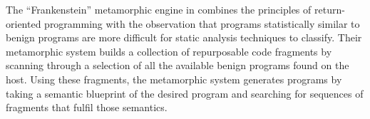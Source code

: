     The ``Frankenstein'' metamorphic engine in \cite{franken} combines the
    principles of return-oriented programming with the observation that programs
    statistically similar to benign programs are more difficult for static
    analysis techniques to classify. Their metamorphic system builds a
    collection of repurposable code fragments by scanning through a selection of
    all the available benign programs found on the host. Using these fragments,
    the metamorphic system generates programs by taking a semantic blueprint of
    the desired program and searching for sequences of fragments that fulfil
    those semantics.

